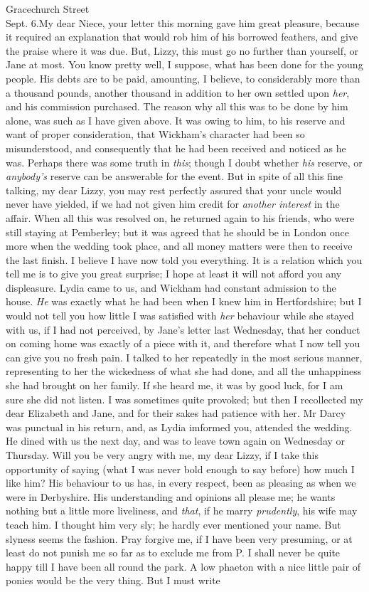 \begin{mail}{Gracechurch Street\\ Sept. 6.}{My dear Niece,}
your letter this morning gave him great pleasure, because it required an explanation that would rob him of his borrowed feathers, and give the praise where it was due. But, Lizzy, this must go no further than yourself, or Jane at most. You know pretty well, I suppose, what has been done for the young people. His debts are to be paid, amounting, I believe, to considerably more than a thousand pounds, another thousand in addition to her own settled upon \textit{her}, and his commission purchased. The reason why all this was to be done by him alone, was such as I have given above. It was owing to him, to his reserve and want of proper consideration, that Wickham's character had been so misunderstood, and consequently that he had been received and noticed as he was. Perhaps there was some truth in \textit{this}; though I doubt whether \textit{his} reserve, or \textit{anybody's} reserve can be answerable for the event. But in spite of all this fine talking, my dear Lizzy, you may rest perfectly assured that your uncle would never have yielded, if we had not given him credit for \textit{another interest} in the affair. When all this was resolved on, he returned again to his friends, who were still staying at Pemberley; but it was agreed that he should be in London once more when the wedding took place, and all money matters were then to receive the last finish. I believe I have now told you everything. It is a relation which you tell me is to give you great surprise; I hope at least it will not afford you any displeasure. Lydia came to us, and Wickham had constant admission to the house. \textit{He} was exactly what he had been when I knew him in Hertfordshire; but I would not tell you how little I was satisfied with \textit{her} behaviour while she stayed with us, if I had not perceived, by Jane's letter last Wednesday, that her conduct on coming home was exactly of a piece with it, and therefore what I now tell you can give you no fresh pain. I talked to her repeatedly in the most serious manner, representing to her the wickedness of what she had done, and all the unhappiness she had brought on her family. If she heard me, it was by good luck, for I am sure she did not listen. I was sometimes quite provoked; but then I recollected my dear Elizabeth and Jane, and for their sakes had patience with her. Mr Darcy was punctual in his return, and, as Lydia imformed you, attended the wedding. He dined with us the next day, and was to leave town again on Wednesday or Thursday. Will you be very angry with me, my dear Lizzy, if I take this opportunity of saying (what I was never bold enough to say before) how much I like him? His behaviour to us has, in every respect, been as pleasing as when we were in Derbyshire. His understanding and opinions all please me; he wants nothing but a little more liveliness, and \textit{that}, if he marry \textit{prudently}, his wife may teach him. I thought him very sly; he hardly ever mentioned your name. But slyness seems the fashion. Pray forgive me, if I have been very presuming, or at least do not punish me so far as to exclude me from P. I shall never be quite happy till I have been all round the park. A low phaeton with a nice little pair of ponies would be the very thing. But I must write 
\end{mail}
